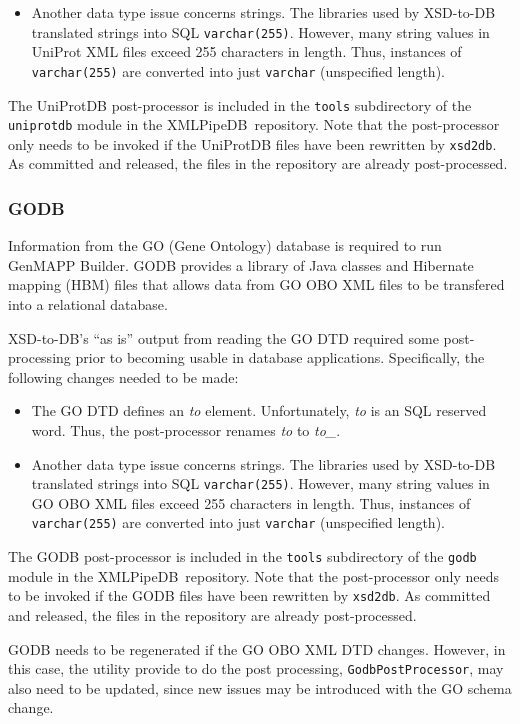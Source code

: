 \documentclass[10pt]{bmc_article}
\newenvironment{bmcformat}{\begin{raggedright}\baselineskip20pt\sloppy\setboolean{publ}{false}}{\end{raggedright}\baselineskip20pt\sloppy}
\def\xmlpipedb{XMLPipeDB}                       %
\def\xsd2db{\texttt{xsd2db}}
\begin{document}
\begin{bmcformat}
\begin{itemize}
\item Another data type issue concerns strings.  The libraries used by XSD-to-DB translated strings into SQL \texttt{varchar(255)}.  However, many string values in UniProt XML files exceed 255 characters in length.  Thus, instances of \texttt{varchar(255)} are converted into just \texttt{varchar} (unspecified length).
\end{itemize}
The UniProtDB post-processor is included in the \texttt{tools} subdirectory of the \texttt{uniprotdb} module in the \xmlpipedb\ repository.  Note that the post-processor only needs to be invoked if the UniProtDB files have been rewritten by \xsd2db.  As committed and released, the files in the repository are already post-processed.\pb

\subsubsection*{GODB}

Information from the GO (Gene Ontology) database is required to run GenMAPP Builder.  GODB provides a library of Java classes and Hibernate mapping (HBM) files that allows data from GO OBO XML files to be transfered into a relational database.\pb

XSD-to-DB's ``as is'' output from reading the GO DTD \cite{godtd} required some post-processing prior to becoming usable in database applications.  Specifically, the following changes needed to be made:
\begin{itemize}
\item The GO DTD defines an \textsl{to} element.  Unfortunately, \textsl{to} is an SQL reserved word.  Thus, the post-processor renames \textsl{to} to \textsl{to\_}.

\item Another data type issue concerns strings.  The libraries used by XSD-to-DB translated strings into SQL \texttt{varchar(255)}.  However, many string values in GO OBO XML files exceed 255 characters in length.  Thus, instances of \texttt{varchar(255)} are converted into just \texttt{varchar} (unspecified length).
\end{itemize}
The GODB post-processor is included in the \texttt{tools} subdirectory of the \texttt{godb} module in the \xmlpipedb\ repository.  Note that the post-processor only needs to be invoked if the GODB files have been rewritten by \xsd2db.  As committed and released, the files in the repository are already post-processed.\pb

GODB needs to be regenerated if the GO OBO XML DTD changes.  However, in this case, the utility provide to do the post processing, \texttt{GodbPostProcessor}, may also need to be updated, since new issues may be introduced with the GO schema change.\pb


\end{bmcformat}
\end{document}
